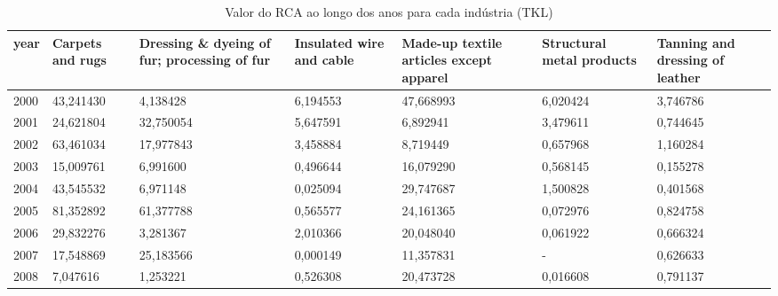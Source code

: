 \begin{table}
\centering
\caption{Valor do RCA ao longo dos anos para cada indústria (TKL)}
\begin{tabular}{p{1cm}p{2cm}p{2cm}p{2cm}p{2cm}p{2cm}p{2cm}}
\toprule
 year &  Carpets and rugs &  Dressing \& dyeing of fur; processing of fur &  Insulated wire and cable &  Made-up textile articles except apparel &  Structural metal products &  Tanning and dressing of leather \\
\midrule
 2000 &         43,241430 &                                     4,138428 &                  6,194553 &                                47,668993 &                   6,020424 &                         3,746786 \\
 2001 &         24,621804 &                                    32,750054 &                  5,647591 &                                 6,892941 &                   3,479611 &                         0,744645 \\
 2002 &         63,461034 &                                    17,977843 &                  3,458884 &                                 8,719449 &                   0,657968 &                         1,160284 \\
 2003 &         15,009761 &                                     6,991600 &                  0,496644 &                                16,079290 &                   0,568145 &                         0,155278 \\
 2004 &         43,545532 &                                     6,971148 &                  0,025094 &                                29,747687 &                   1,500828 &                         0,401568 \\
 2005 &         81,352892 &                                    61,377788 &                  0,565577 &                                24,161365 &                   0,072976 &                         0,824758 \\
 2006 &         29,832276 &                                     3,281367 &                  2,010366 &                                20,048040 &                   0,061922 &                         0,666324 \\
 2007 &         17,548869 &                                    25,183566 &                  0,000149 &                                11,357831 &                          - &                         0,626633 \\
 2008 &          7,047616 &                                     1,253221 &                  0,526308 &                                20,473728 &                   0,016608 &                         0,791137 \\

\end{tabular}
\end{table}
